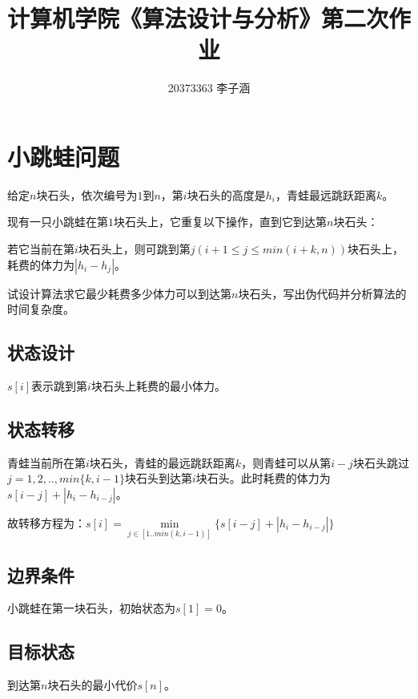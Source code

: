\documentclass{article}
\title{ 计算机学院《算法设计与分析》第二次作业}
\author{20373363 李子涵}
\begin{document}
\maketitle

\section{小跳蛙问题}

给定$n$块石头，依次编号为$1$到$n$，第$i$块石头的高度是$h_i$，青蛙最远跳跃距离$k$。

现有一只小跳蛙在第$1$块石头上，它重复以下操作，直到它到达第$n$块石头：

若它当前在第$i$块石头上，则可跳到第$j(i + 1\leq j\leq min(i + k, n))$块石头上，耗费的体力为$|h_i-h_j|$。

试设计算法求它最少耗费多少体力可以到达第$n$块石头，写出伪代码并分析算法的时间复杂度。

\subsection{状态设计}
$s[i]$表示跳到第$i$块石头上耗费的最小体力。

\subsection{状态转移}
青蛙当前所在第$i$块石头，青蛙的最远跳跃距离$k$，则青蛙可以从第$i-j$块石头跳过$j=1,2,.. ,min\{k,i-1\}$块石头到达第$i$块石头。此时耗费的体力为$s[i-j]+|h_i-h_{i-j}|$。

故转移方程为：$s[i]=\min\limits_{j\in [1..min(k,i-1)]}\{s[i-j]+|h_i-h_{i-j}|\}$


\subsection{边界条件}
小跳蛙在第一块石头，初始状态为$s[1]=0$。

\subsection{目标状态}
到达第$n$块石头的最小代价$s[n]$。
\end{document}
